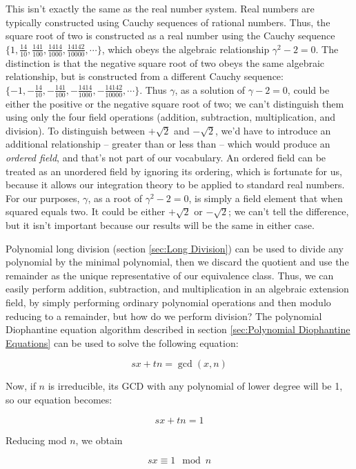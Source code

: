 This isn't exactly the same as the real number system.  Real numbers
are typically constructed using Cauchy sequences of rational numbers.
Thus, the square root of two is constructed as a real number using the
Cauchy sequence
$\{1, \frac{14}{10}, \frac{141}{100}, \frac{1414}{1000}, \frac{14142}{10000}, \cdots\}$,
which obeys the algebraic relationship $\gamma^2-2=0$.  The
distinction is that the negative square root of two obeys the same
algebraic relationship, but is constructed from a different Cauchy
sequence: $\{-1, -\frac{14}{10}, -\frac{141}{100}, -\frac{1414}{1000},
-\frac{14142}{10000}, \cdots\}$.  Thus $\gamma$, as a solution of
$\gamma-2=0$, could be either the positive or the negative square root
of two; we can't distinguish them using only the four field operations
(addition, subtraction, multiplication, and division).  To distinguish
between $+\sqrt{2}$ and $-\sqrt{2}$, we'd have to introduce an
additional relationship -- greater than or less than -- which would
produce an {\it ordered field}, and that's not part of our vocabulary.
An ordered field can be treated as an unordered field by ignoring its
ordering, which is fortunate for us, because it allows our integration
theory to be applied to standard real numbers.  For our purposes,
$\gamma$, as a root of $\gamma^2-2=0$, is simply a field element that
when squared equals two.  It could be either $+\sqrt{2}$ or
$-\sqrt{2}$; we can't tell the difference, but it isn't important
because our results will be the same in either case.

Polynomial long division (section \ref{sec:Long Division}) can be used
to divide any polynomial by the minimal polynomial, then we discard
the quotient and use the remainder as the unique representative of our
equivalence class.  Thus, we can easily perform addition, subtraction,
and multiplication in an algebraic extension field, by simply
performing ordinary polynomial operations and then modulo reducing to
a remainder, but how do we perform division?  The polynomial
Diophantine equation algorithm described in
section \ref{sec:Polynomial Diophantine Equations} can be used to
solve the following equation:

$$sx + tn = \gcd(x,n)$$

Now, if $n$ is irreducible, its GCD with any polynomial
of lower degree will be 1, so our equation becomes:

$$sx + tn = 1$$

Reducing mod $n$, we obtain

$$sx \equiv 1 \mod n$$


